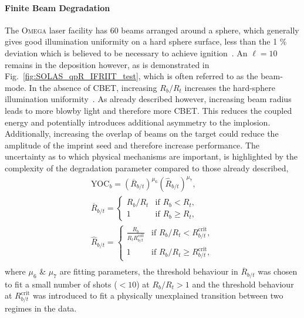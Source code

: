 \paragraph*{Finite Beam Degradation}
The \textsc{Omega} laser facility has 60 beams arranged around a sphere, which generally gives good illumination uniformity on a hard sphere surface, less than the 1 \% deviation which is believed to be necessary to achieve ignition~\cite{craxton_direct-drive_2015,goncharov_national_2017}.
An $\ell=10$ remains in the deposition however, as is demonstrated in Fig.~\ref{fig:SOLAS_qpR_IFRIIT_test}, which is often referred to as the beam-mode.
In the absence of \ac{CBET}, increasing $R_b/R_t$ increases the hard-sphere illumination uniformity~\cite{gopalaswamy_using_2021}.
As already described however, increasing beam radius leads to more blowby light and therefore more \ac{CBET}.
This reduces the coupled energy and potentially introduces additional asymmetry to the implosion.
Additionally, increasing the overlap of beams on the target could reduce the amplitude of the imprint seed and therefore increase performance.
The uncertainty as to which physical mechanisms are important, is highlighted by the complexity of the degradation parameter compared to those already described,
\begin{equation}
    \label{eq:Res1_RbRt_degradation}
    \begin{gathered}
        \text{YOC}_{b} = \left( \overline{R}_{b/t} \right)^{\mu_6} \left( \hat{R}_{b/t} \right)^{\mu_7}, \\
        \overline{R}_{b/t} =
        \begin{cases}
            R_b/R_t & \text{if } R_b<R_t, \\
            1 &  \text{if } R_b\geq R_t,
        \end{cases} \\
        \hat{R}_{b/t} =
        \begin{cases}
            \frac{R_b}{R_t R_{b/t}^{\text{crit}}} & \text{if } R_b/R_t < R_{b/t}^{\text{crit}}, \\
            1 & \text{if } R_b/R_t \geq R_{b/t}^{\text{crit}},
        \end{cases} \\
    \end{gathered}
\end{equation}
where $\mu_6$ \& $\mu_7$ are fitting parameters, the threshold behaviour in $\overline{R}_{b/t}$ was chosen to fit a small number of shots ($<10$) at $R_b/R_t>1$ and the threshold behaviour at $R_{b/t}^{\text{crit}}$ was introduced to fit a physically unexplained transition between two regimes in the data.

